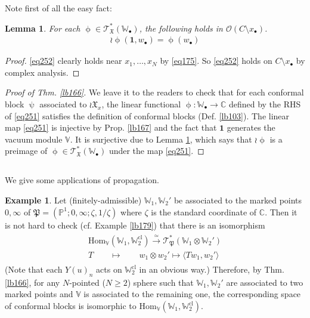 \documentclass[11pt,b5paper,notitlepage]{article}
\theoremstyle{definition}
\newtheorem{eg}[df]{Example}
\theoremstyle{plain}
\newtheorem{lm}[df]{Lemma}
\newcommand{\fk}{\mathfrak}
\newcommand{\id}{\mathbf{1}}
\newcommand{\Hom}{\mathrm{Hom}}
\newcommand{\bk}[1]{\langle {#1}\rangle}
\newcommand{\scr}{\mathscr}
\newcommand{\blt}{\bullet}
\newcommand{\Vbb}{\mathbb V}
\newcommand{\Wbb}{\mathbb W}
\newcommand{\Cbb}{\mathbb C}
\newcommand{\Pbb}{\mathbb P}
\newcommand{\cl}{\mathrm{cl}}
\numberwithin{equation}{section}
\begin{document}
Note first of all the easy fact:

\begin{lm}\label{lb168}
For each $\upphi\in\scr T_{\fk X}^*(\Wbb_\blt)$, the following holds in $\scr O(C\setminus x_\blt)$.
\begin{align}
\wr\upphi(\id,w_\blt)=\upphi(w_\blt)\label{eq252}
\end{align}
\end{lm}
\begin{proof}
\eqref{eq252} clearly holds near $x_1,\dots,x_N$ by \eqref{eq175}. So \eqref{eq252} holds on $C\setminus x_\blt$ by complex analysis.
\end{proof}

\begin{proof}[Proof of Thm. \ref{lb166}]
We leave it to the readers to check that for each conformal block $\uppsi$ associated to $\wr\fk X_x$, the linear functional $\upphi:\Wbb_\blt\rightarrow\Cbb$ defined by the RHS of \eqref{eq251} satisfies the definition of conformal blocks (Def. \ref{lb103}). The linear map \eqref{eq251} is injective by Prop. \ref{lb167} and the fact that $\id$ generates the vacuum module $\Vbb$. It is surjective due to Lemma \ref{lb168}, which says that $\wr\upphi$ is a preimage of $\upphi\in\scr T_{\fk X}^*(\Wbb_\blt)$ under the map \eqref{eq251}.
\end{proof}


\subsection{}\label{lb182}

We give some applications of propagation.
\begin{eg}\label{lb177}
Let (finitely-admissible) $\Wbb_1,\Wbb_2'$ be associated to the marked points $0,\infty$ of $\fk P=(\Pbb^1;0,\infty;\zeta,1/\zeta)$ where $\zeta$ is the standard coordinate of $\Cbb$. Then it is not hard to check (cf. Example \ref{lb179}) that there is an isomorphism
\begin{gather}
\begin{gathered}
\Hom_\Vbb(\Wbb_1,\Wbb_2^\cl)\xrightarrow{\simeq} \scr T_{\fk P}^*(\Wbb_1\otimes\Wbb_2')\\
T\qquad\mapsto\qquad \boxed{w_1\otimes w_2'\mapsto\bk{T w_1,w_2'}}
\end{gathered}
\end{gather}
(Note that each $Y(u)_n$ acts on $\Wbb_2^\cl$ in an obvious way.) Therefore, by Thm. \ref{lb166}, for any $N$-pointed ($N\geq 2$) sphere such that $\Wbb_1,\Wbb_2'$ are associated to two marked points and $\Vbb$ is associated to the remaining one, the corresponding space of conformal blocks is isomorphic to $\Hom_\Vbb(\Wbb_1,\Wbb_2^\cl)$.
\end{eg}
\end{document}

